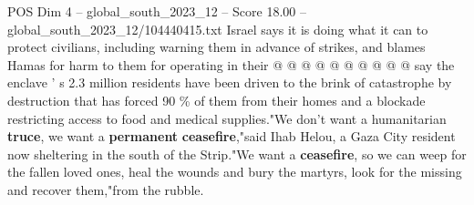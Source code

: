 \begin{textsample}{POS Dim 4 – global\_south\_2023\_12 – Score 18.00 – global\_south\_2023\_12/104440415.txt}
Israel says it is doing what it can to protect civilians, including warning them in advance of strikes, and blames Hamas for harm to them for operating in their @ @ @ @ @ @ @ @ @ @ say the enclave ' s 2.3 million residents have been driven to the brink of catastrophe by destruction that has forced 90 \% of them from their homes and a blockade restricting access to food and medical supplies."We don't want a humanitarian \textbf{truce}, we want a \textbf{permanent} \textbf{ceasefire},"said Ihab Helou, a Gaza City resident now sheltering in the south of the Strip."We want a \textbf{ceasefire}, so we can weep for the fallen loved ones, heal the wounds and bury the martyrs, look for the missing and recover them,"from the rubble.

\end{textsample}
